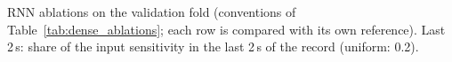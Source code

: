 \begin{table}[htbp]
\centering
\caption[Recurrent networks: ablations (validation)]{RNN ablations on the validation fold (conventions of Table~\ref{tab:dense_ablations}; each row is compared with its own reference). Last 2\,s: share of the input sensitivity in the last 2\,s of the record (uniform: 0.2).}
\label{tab:rnn_ablations}
\small
\begin{adjustbox}{max width=\textwidth}

\end{adjustbox}
\end{table}
